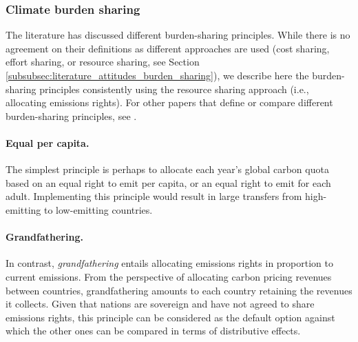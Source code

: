 
\subsubsection{Climate burden sharing}\label{subsubsec:literature_burden_sharing} 

The literature has discussed different burden-sharing principles. While there is no  agreement on their definitions as different approaches are used (cost sharing, effort sharing, or resource sharing, see Section \ref{subsubsec:literature_attitudes_burden_sharing}), we describe here the burden-sharing principles consistently using the resource sharing approach (i.e., allocating emissions rights). For other papers that define or compare different burden-sharing principles, see \citet{leimbach_burden_2019,zhou_carbon_2016,vaillancourt_equity_2004}.

\paragraph{Equal per capita.} The simplest principle is perhaps to allocate each year's global carbon quota based on an equal right to emit per capita, or an equal right to emit for each adult. Implementing this principle would result in large transfers from high-emitting to low-emitting countries. 

\paragraph{Grandfathering.} In contrast, \textit{grandfathering} entails allocating emissions rights in proportion to current emissions. From the perspective of allocating carbon pricing revenues between countries, grandfathering amounts to each country retaining the revenues it collects. Given that nations are sovereign and have not agreed to share emissions rights, this principle can be considered as the default option against which the other ones can be compared in terms of distributive effects.

